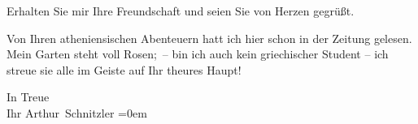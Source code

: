 \pstart
           Erhalten Sie mir Ihre Freundschaft und seien Sie von Herzen gegrüßt.\pend
           
\pstart
           Von Ihren atheniensischen Abenteuern hatt ich
               hier schon in der Zeitung gelesen. Mein Garten steht voll Rosen; – bin ich auch kein
                  griechischer Student – ich streue sie alle
               im Geiste auf Ihr theures Haupt!\pend
           
\pstart
           In Treue{\\[\baselineskip]}Ihr \spacefill\mbox{Arthur Schnitzler}\pend
           \leftskip=0em{}\endnumbering{}  \newcommand{\dateiname}{L02387}\newcommand{\titel}{Arthur Schnitzler an Georg Brandes, 7. 6. 1922}\newcommand{\editorInnen}{Martin Anton Müller und Gerd-Hermann Susen}
